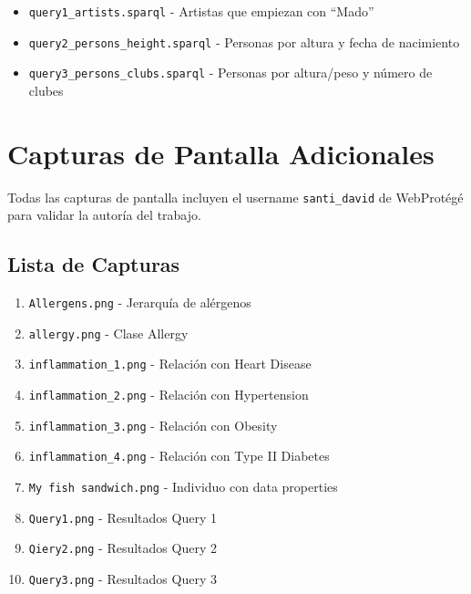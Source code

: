 \documentclass[12pt,a4paper]{article}
\begin{document}
\begin{itemize}
    \item \texttt{query1\_artists.sparql} - Artistas que empiezan con ``Mado''
    \item \texttt{query2\_persons\_height.sparql} - Personas por altura y fecha de nacimiento
    \item \texttt{query3\_persons\_clubs.sparql} - Personas por altura/peso y número de clubes
\end{itemize}

\section{Capturas de Pantalla Adicionales}

Todas las capturas de pantalla incluyen el username \texttt{santi\_david} de WebProtégé para validar la autoría del trabajo.

\subsection{Lista de Capturas}

\begin{enumerate}
    \item \texttt{Allergens.png} - Jerarquía de alérgenos
    \item \texttt{allergy.png} - Clase Allergy
    \item \texttt{inflammation\_1.png} - Relación con Heart Disease
    \item \texttt{inflammation\_2.png} - Relación con Hypertension
    \item \texttt{inflammation\_3.png} - Relación con Obesity
    \item \texttt{inflammation\_4.png} - Relación con Type II Diabetes
    \item \texttt{My fish sandwich.png} - Individuo con data properties
    \item \texttt{Query1.png} - Resultados Query 1
    \item \texttt{Qiery2.png} - Resultados Query 2
    \item \texttt{Query3.png} - Resultados Query 3
\end{enumerate}

\end{document}
